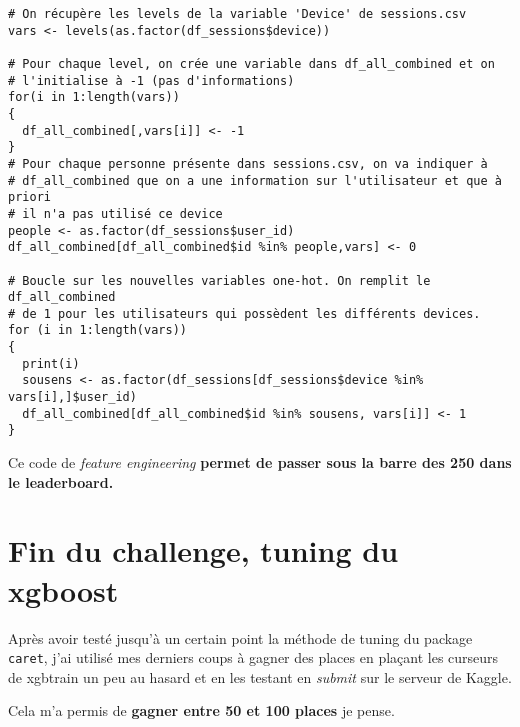 \documentclass[a4paper,11pt]{article}
\begin{document}
\begin{lstlisting}
# On récupère les levels de la variable 'Device' de sessions.csv
vars <- levels(as.factor(df_sessions$device))

# Pour chaque level, on crée une variable dans df_all_combined et on
# l'initialise à -1 (pas d'informations)
for(i in 1:length(vars))
{
  df_all_combined[,vars[i]] <- -1
}
# Pour chaque personne présente dans sessions.csv, on va indiquer à
# df_all_combined que on a une information sur l'utilisateur et que à priori
# il n'a pas utilisé ce device
people <- as.factor(df_sessions$user_id)
df_all_combined[df_all_combined$id %in% people,vars] <- 0

# Boucle sur les nouvelles variables one-hot. On remplit le df_all_combined
# de 1 pour les utilisateurs qui possèdent les différents devices.
for (i in 1:length(vars))
{
  print(i)
  sousens <- as.factor(df_sessions[df_sessions$device %in% vars[i],]$user_id)
  df_all_combined[df_all_combined$id %in% sousens, vars[i]] <- 1
}
\end{lstlisting}

Ce code de \textit{feature engineering} \textbf{permet de passer sous la barre des 250 dans le leaderboard.}

\section*{Fin du challenge, tuning du xgboost}

Après avoir testé jusqu'à un certain point la méthode de tuning du package \texttt{caret}, j'ai utilisé mes derniers coups à gagner des places en plaçant les curseurs de xgbtrain un peu au hasard et en les testant en \textit{submit} sur le serveur de Kaggle.

Cela m'a permis de \textbf{gagner entre 50 et 100 places} je pense.
\end{document}
